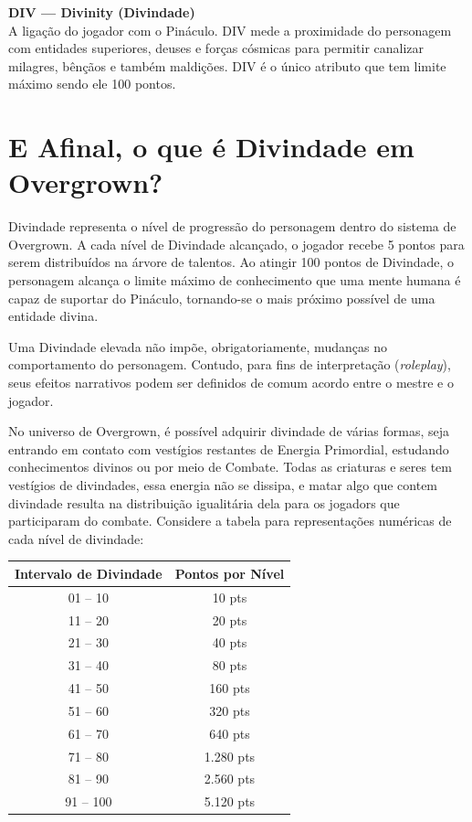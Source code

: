 \noindent
\hypertarget{target:divinity}{\textbf{\baskerfamily\large DIV — Divinity (Divindade)}}\\
A ligação do jogador com o Pináculo. DIV mede a proximidade do personagem com entidades superiores, deuses e forças cósmicas para permitir canalizar milagres, bênçãos e também maldições. DIV é o único atributo que tem limite máximo sendo ele 100 pontos.

\section*{E Afinal, o que é Divindade em Overgrown?}

Divindade representa o nível de progressão do personagem dentro do sistema de Overgrown. A cada nível de Divindade alcançado, o jogador recebe 5 pontos para serem distribuídos na árvore de talentos. Ao atingir 100 pontos de Divindade, o personagem alcança o limite máximo de conhecimento que uma mente humana é capaz de suportar do Pináculo, tornando-se o mais próximo possível de uma entidade divina.

Uma Divindade elevada não impõe, obrigatoriamente, mudanças no comportamento do personagem. Contudo, para fins de interpretação (\textit{roleplay}), seus efeitos narrativos podem ser definidos de comum acordo entre o mestre e o jogador.

No universo de Overgrown, é possível adquirir divindade de várias formas, seja entrando em contato com vestígios restantes de Energia Primordial, estudando conhecimentos divinos ou por meio de Combate. Todas as criaturas e seres tem vestígios de divindades, essa energia não se dissipa, e matar algo que contem divindade resulta na distribuição igualitária dela para os jogadors que participaram do combate. Considere a tabela para representações numéricas de cada nível de divindade:

\begin{center}
\renewcommand{\arraystretch}{1.3}
\begin{tabular}{@{} cc @{}}
\toprule
\rowcolor{gray!15} \textbf{Intervalo de Divindade} & \textbf{Pontos por Nível} \\ 
\midrule
01 -- 10 & 10 pts \\
11 -- 20 & 20 pts \\
21 -- 30 & 40 pts \\
31 -- 40 & 80 pts \\
41 -- 50 & 160 pts \\
\midrule
51 -- 60 & 320 pts \\
61 -- 70 & 640 pts \\
71 -- 80 & 1.280 pts \\
81 -- 90 & 2.560 pts \\
91 -- 100 & 5.120 pts \\
\bottomrule
\end{tabular}
\end{center}



